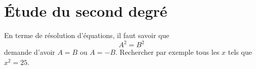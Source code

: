 \section{Étude du second degré}

En terme de résolution d'équations, il faut savoir que
\begin{equation}
    A^2=B^2
\end{equation}
demande d'avoir \( A=B\) ou \( A=-B\). Rechercher par exemple tous les \( x\) tels que \( x^2=25\).

